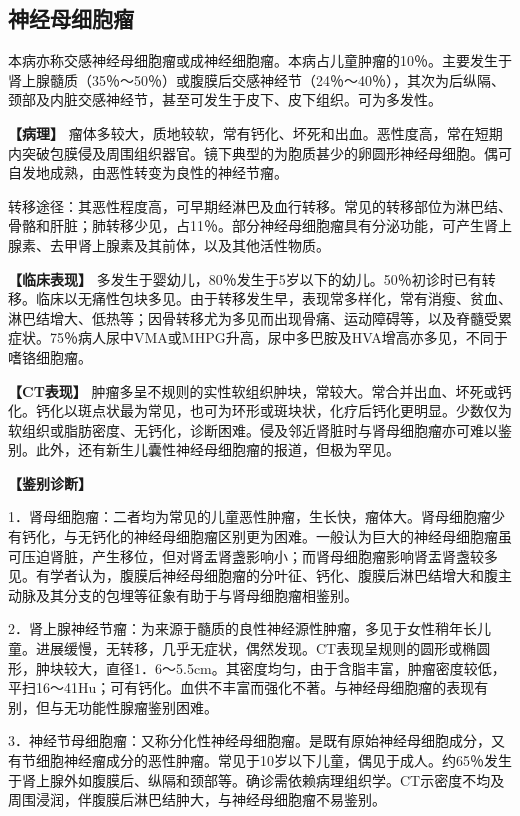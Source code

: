 \subsection{神经母细胞瘤}

本病亦称交感神经母细胞瘤或成神经细胞瘤。本病占儿童肿瘤的10％。主要发生于肾上腺髓质（35％～50％）或腹膜后交感神经节（24％～40％），其次为后纵隔、颈部及内脏交感神经节，甚至可发生于皮下、皮下组织。可为多发性。

\textbf{【病理】}
瘤体多较大，质地较软，常有钙化、坏死和出血。恶性度高，常在短期内突破包膜侵及周围组织器官。镜下典型的为胞质甚少的卵圆形神经母细胞。偶可自发地成熟，由恶性转变为良性的神经节瘤。

转移途径：其恶性程度高，可早期经淋巴及血行转移。常见的转移部位为淋巴结、骨骼和肝脏；肺转移少见，占11％。部分神经母细胞瘤具有分泌功能，可产生肾上腺素、去甲肾上腺素及其前体，以及其他活性物质。

\textbf{【临床表现】}
多发生于婴幼儿，80％发生于5岁以下的幼儿。50％初诊时已有转移。临床以无痛性包块多见。由于转移发生早，表现常多样化，常有消瘦、贫血、淋巴结增大、低热等；因骨转移尤为多见而出现骨痛、运动障碍等，以及脊髓受累症状。75％病人尿中VMA或MHPG升高，尿中多巴胺及HVA增高亦多见，不同于嗜铬细胞瘤。

\textbf{【CT表现】}
肿瘤多呈不规则的实性软组织肿块，常较大。常合并出血、坏死或钙化。钙化以斑点状最为常见，也可为环形或斑块状，化疗后钙化更明显。少数仅为软组织或脂肪密度、无钙化，诊断困难。侵及邻近肾脏时与肾母细胞瘤亦可难以鉴别。此外，还有新生儿囊性神经母细胞瘤的报道，但极为罕见。

\textbf{【鉴别诊断】}

1．肾母细胞瘤：二者均为常见的儿童恶性肿瘤，生长快，瘤体大。肾母细胞瘤少有钙化，与无钙化的神经母细胞瘤区别更为困难。一般认为巨大的神经母细胞瘤虽可压迫肾脏，产生移位，但对肾盂肾盏影响小；而肾母细胞瘤影响肾盂肾盏较多见。有学者认为，腹膜后神经母细胞瘤的分叶征、钙化、腹膜后淋巴结增大和腹主动脉及其分支的包埋等征象有助于与肾母细胞瘤相鉴别。

2．肾上腺神经节瘤：为来源于髓质的良性神经源性肿瘤，多见于女性稍年长儿童。进展缓慢，无转移，几乎无症状，偶然发现。CT表现呈规则的圆形或椭圆形，肿块较大，直径1．6～5.5cm。其密度均匀，由于含脂丰富，肿瘤密度较低，平扫16～41Hu；可有钙化。血供不丰富而强化不著。与神经母细胞瘤的表现有别，但与无功能性腺瘤鉴别困难。

3．神经节母细胞瘤：又称分化性神经母细胞瘤。是既有原始神经母细胞成分，又有节细胞神经瘤成分的恶性肿瘤。常见于10岁以下儿童，偶见于成人。约65％发生于肾上腺外如腹膜后、纵隔和颈部等。确诊需依赖病理组织学。CT示密度不均及周围浸润，伴腹膜后淋巴结肿大，与神经母细胞瘤不易鉴别。

